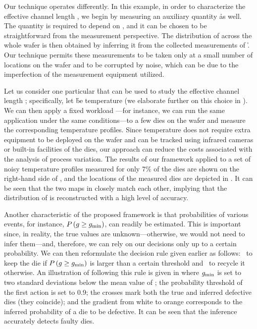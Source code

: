 Our technique operates differently. In this example, in order to characterize
the effective channel length \g, we begin by measuring an auxiliary quantity \h
as well. The quantity is required to depend on \g, and it can be chosen to be
straightforward from the measurement perspective. The distribution of \g across
the whole wafer is then obtained by inferring it from the collected measurements
of \h. Our technique permits these measurements to be taken only at a small
number of locations on the wafer and to be corrupted by noise, which can be due
to the imperfection of the measurement equipment utilized.

Let us consider one particular \h that can be used to study the effective
channel length \g; specifically, let \h be temperature (we elaborate further on
this choice in ). We can then apply a fixed workload
---for instance, we can run the same application under the same conditions---to
a few dies on the wafer and measure the corresponding temperature profiles.
Since temperature does not require extra equipment to be deployed on the wafer
and can be tracked using infrared cameras \cite{mesa-martinez2007} or built-in
facilities of the dies, our approach can reduce the costs associated with the
analysis of process variation. The results of our framework applied to a set of
noisy temperature profiles measured for only 7\% of the dies are shown on the
right-hand side of , and the locations of the measured
dies are depicted in . It can be seen that the two maps
in  closely match each other, implying that the
distribution of \g is reconstructed with a high level of accuracy.

Another characteristic of the proposed framework is that probabilities of
various events, for instance, $P\left(g \geq g_{\mathrm{min}}\right)$, can readily
be estimated. This is important since, in reality, the true values are
unknown---otherwise, we would not need to infer them---and, therefore, we can
rely on our decisions only up to a certain probability. We can then reformulate
the decision rule given earlier as follows: \one~to keep the die if
$P\left(g \geq g_{\mathrm{min}}\right)$ is larger than a certain threshold and
\two~to recycle it otherwise. An illustration of following this rule is given in
 where $g_{\mathrm{min}}$ is set to two standard deviations
below the mean value of \g; the probability threshold of the first action is set
to 0.9; the crosses mark both the true and inferred defective dies (they
coincide); and the gradient from white to orange corresponds to the inferred
probability of a die to be defective. It can be seen that the inference
accurately detects faulty dies.

